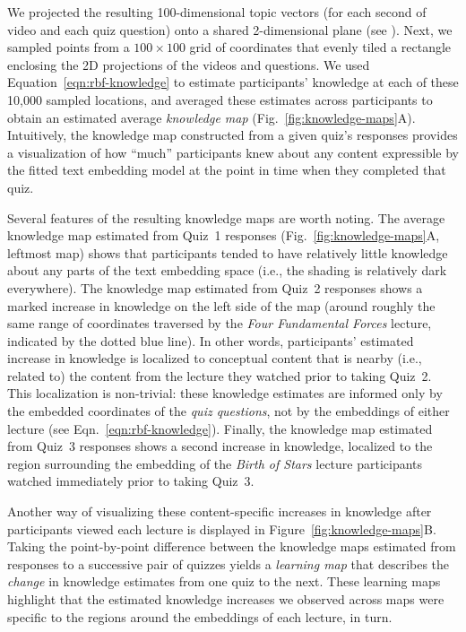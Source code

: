 \documentclass[10pt]{article}
\renewcommand{\nameref}[1]{\mbox{\textit{\oldnameref{#1}}}}
\begin{document}
We projected the resulting 100-dimensional topic vectors (for each second of
video and each quiz question) onto a shared 2-dimensional plane (see
\nameref{subsec:knowledge-maps}). Next, we sampled points from a $100 \times
100$ grid of coordinates that evenly tiled a rectangle enclosing the 2D
projections of the videos and questions. We used
Equation~\ref{eqn:rbf-knowledge} to estimate participants' knowledge at each of
these 10,000 sampled locations, and averaged these estimates across
participants to obtain an estimated average \textit{knowledge map}
(Fig.~\ref{fig:knowledge-maps}A). Intuitively, the knowledge map constructed
from a given quiz's responses provides a visualization of how ``much''
participants knew about any content expressible by the fitted text embedding
model at the point in time when they completed that quiz.

Several features of the resulting knowledge maps are worth noting. The average
knowledge map estimated from Quiz~1 responses (Fig.~\ref{fig:knowledge-maps}A,
leftmost map) shows that participants tended to have relatively little
knowledge about any parts of the text embedding space (i.e., the shading is
relatively dark everywhere). The knowledge map estimated from Quiz~2 responses
shows a marked increase in knowledge on the left side of the map (around
roughly the same range of coordinates traversed by the \textit{Four Fundamental
Forces} lecture, indicated by the dotted blue line). In other words,
participants' estimated increase in knowledge is localized to conceptual
content that is nearby (i.e., related to) the content from the lecture they
watched prior to taking Quiz~2. This localization is non-trivial: these
knowledge estimates are informed only by the embedded coordinates of the
\textit{quiz questions}, not by the embeddings of either lecture (see
Eqn.~\ref{eqn:rbf-knowledge}). Finally, the knowledge map estimated from Quiz~3
responses shows a second increase in knowledge, localized to the region
surrounding the embedding of the \textit{Birth of Stars} lecture participants
watched immediately prior to taking Quiz~3.

Another way of visualizing these content-specific increases in knowledge after
participants viewed each lecture is displayed in
Figure~\ref{fig:knowledge-maps}B. Taking the point-by-point difference between
the knowledge maps estimated from responses to a successive pair of quizzes
yields a \textit{learning map} that describes the \textit{change} in knowledge
estimates from one quiz to the next. These learning maps highlight that the
estimated knowledge increases we observed across maps were specific to the
regions around the embeddings of each lecture, in turn.
\end{document}
